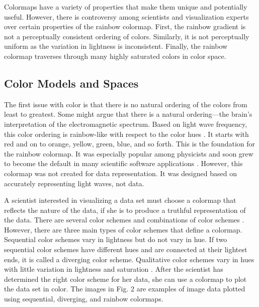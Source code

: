 \documentclass[journal]{IEEEtran}
\begin{document}
Colormaps have a variety of properties that make them unique and potentially
useful. However, there is controversy among scientists and visualization
experts over certain properties of the rainbow colormap. First, the rainbow
gradient is not a perceptually consistent ordering of colors. Similarly, it
is not perceptually uniform as the variation in lightness is inconsistent.
Finally, the rainbow colormap traverses through many
highly saturated colors in color space.

\subsection{Color Models and Spaces}

The first issue with color is that there is no natural ordering of the colors
from least to greatest. Some might argue that there is a natural
ordering---the brain's interpretation of the electromagnetic spectrum.
Based on light wave frequency, this color ordering is rainbow-like with respect
to the color hues \cite{colormapping}. It starts with red and on to orange,
yellow, green, blue, and so forth. This is the foundation for the rainbow colormap.
It was especially popular among physicists and soon grew to become the default
in many scientific software applications \cite{rainbowstill,matlab}. However,
this colormap was not created for data representation. It was designed based
on accurately representing light waves, not data.
\par
A scientist interested in visualizing a data set must
choose a colormap that reflects the nature of the data, if she is to produce
a truthful representation of the data.
There are several color schemes and combinations of
color schemes \cite{colorguidelines}. However, there are
three main types of color schemes that define a colormap.
Sequential color schemes vary in lightness but do not
vary in hue. If two sequential color schemes have different hues and are
connected at their lightest ends, it is called a diverging color scheme. Qualitative color
schemes vary in hues with little variation in lightness
and saturation \cite{colormapping}. After the scientist has
determined the right color scheme for her data, she can
use a colormap to plot the data set in color.
The images in Fig. 2 are examples of image data plotted using
sequential, diverging, and rainbow colormaps.

\par
\end{document}
